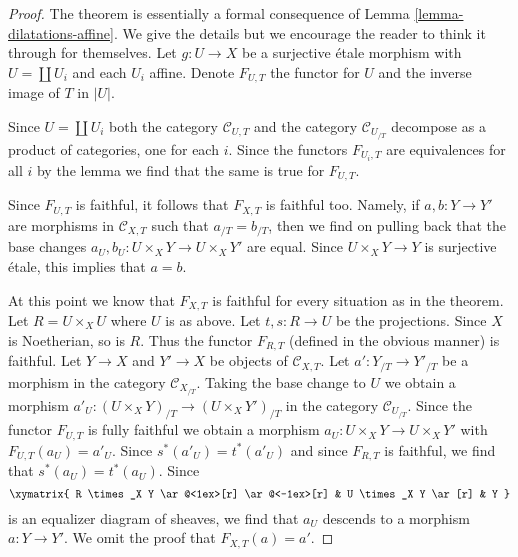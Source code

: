 \begin{proof}
The theorem is essentially a formal consequence of
Lemma \ref{lemma-dilatations-affine}. We give the details but
we encourage the reader to think it through for themselves.
Let $g : U \to X$ be a surjective \'etale morphism with $U = \coprod U_i$
and each $U_i$ affine. Denote $F_{U, T}$ the functor for $U$ and the
inverse image of $T$ in $|U|$.

\medskip\noindent
Since $U = \coprod U_i$ both the category $\mathcal{C}_{U, T}$ and
the category $\mathcal{C}_{U_{/T}}$ decompose as a product of categories,
one for each $i$. Since the functors $F_{U_i, T}$ are equivalences
for all $i$ by the lemma we find that the same is true for $F_{U, T}$.

\medskip\noindent
Since $F_{U, T}$ is faithful, it follows that $F_{X, T}$
is faithful too. Namely, if $a, b : Y \to Y'$ are morphisms
in $\mathcal{C}_{X, T}$ such that $a_{/T} = b_{/T}$, then we find
on pulling back that the base changes
$a_U, b_U : U \times_X Y \to U \times_X Y'$ are equal.
Since $U \times_X Y \to Y$ is surjective \'etale, this implies that $a = b$.

\medskip\noindent
At this point we know that $F_{X, T}$ is faithful for every situation
as in the theorem. Let $R = U \times_X U$ where $U$ is as above.
Let $t, s : R \to U$ be the projections.
Since $X$ is Noetherian, so is $R$. Thus the functor $F_{R, T}$
(defined in the obvious manner) is
faithful. Let $Y \to X$ and $Y' \to X$ be objects of $\mathcal{C}_{X, T}$.
Let $a' : Y_{/T} \to Y'_{/T}$ be a morphism in the category
$\mathcal{C}_{X_{/T}}$. Taking the base change to $U$ we obtain a
morphism $a'_U : (U \times_X Y)_{/T} \to (U \times_X Y')_{/T}$
in the category $\mathcal{C}_{U_{/T}}$. Since the functor $F_{U, T}$
is fully faithful we obtain a morphism $a_U : U \times_X Y \to U \times_X Y'$
with $F_{U, T}(a_U) = a'_U$. Since $s^*(a'_U) = t^*(a'_U)$ and since
$F_{R, T}$ is faithful, we find that $s^*(a_U) = t^*(a_U)$.
Since
$$
\xymatrix{
R \times_X Y \ar@<1ex>[r] \ar@<-1ex>[r] &
U \times_X Y \ar[r] & Y
}
$$
is an equalizer diagram of sheaves, we find that $a_U$ descends to
a morphism $a : Y \to Y'$. We omit the proof that $F_{X, T}(a) = a'$.


\end{proof}

